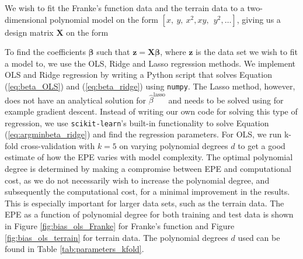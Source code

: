 \documentclass[a4paper, 10pt]{article}
\begin{document}
\begin{multicols}{2}
We wish to fit the Franke's function data and the terrain data to a two-dimensional polynomial model on the form $[x,\ y,\ x^2, xy,\ \ y^2, \dots]$,  giving us a design matrix $\bm{X}$ on the form \\

\setlength{\arraycolsep}{1.5pt}
\noindent
{}
\vspace{1pt}

\noindent
To find the coefficients $\bm{\beta}$ such that $\bm{ z} = \bm{X \beta} $, where $\bm{z}$ is the data set we wish to fit a model to, we use the OLS, Ridge and Lasso regression methods. 
We implement OLS and Ridge regression by writing a Python script that solves Equation (\ref{eq:beta_OLS}) and (\ref{eq:beta_ridge}) using \texttt{numpy}. The Lasso method, however, does not have an analytical solution for $\hat{\beta}^\text{lasso}$ and needs to be solved using for example gradient descent. Instead of writing our own code for solving this type of regression, we use \texttt{scikit-learn}'s built-in functionality to solve Equation (\ref{eq:argminbeta_ridge}) and find the regression parameters.
\noindent
For OLS, we run k-fold cross-validation with $k=5$ on varying polynomial degrees $d$ to get a good estimate of how the EPE varies with model complexity. The optimal polynomial degree is determined by making a compromise between EPE and computational cost, as we do not necessarily wish to increase the polynomial degree, and subsequently the computational cost, for a minimal improvement in the results. This is especially important for larger data sets, such as the terrain data. The EPE as a function of polynomial degree for both training and test data is shown in Figure \ref{fig:bias_ols_Franke} for Franke's function and Figure \ref{fig:bias_ols_terrain} for terrain data. The polynomial degrees $d$ used can be found in Table \ref{tab:parameters_kfold}.


\end{multicols}
\end{document}
